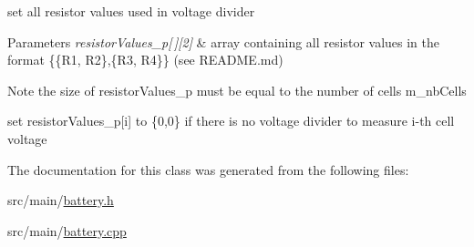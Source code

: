 set all resistor values used in voltage divider 


\begin{DoxyParams}{Parameters}
{\em resistor\+Values\+\_\+p\mbox{[}$\,$\mbox{]}\mbox{[}2\mbox{]}} & array containing all resistor values in the format \{\{R1, R2\},\{R3, R4\}\} (see R\+E\+A\+D\+M\+E.\+md) \\
\hline
\end{DoxyParams}
\begin{DoxyNote}{Note}
the size of resistor\+Values\+\_\+p must be equal to the number of cells m\+\_\+nb\+Cells 

set resistor\+Values\+\_\+p\mbox{[}i\mbox{]} to \{0,0\} if there is no voltage divider to measure i-\/th cell voltage 
\end{DoxyNote}


The documentation for this class was generated from the following files\+:\begin{DoxyCompactItemize}
\item 
src/main/\hyperlink{battery_8h}{battery.\+h}\item 
src/main/\hyperlink{battery_8cpp}{battery.\+cpp}\end{DoxyCompactItemize}
